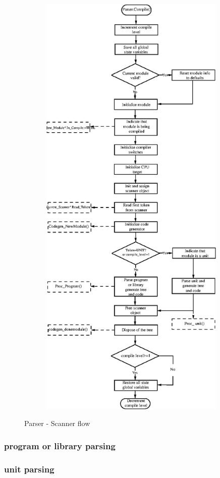 \documentclass [a4paper,12pt]{article}
\begin{document}
\begin{figure}
\begin{center}
\includegraphics[width=4.99in,height=8.36in]{arch8.eps}
\fi
\label{fig8}
\caption{Parser - Scanner flow}
\end{center}
\end{figure}

\subsubsection{program or library parsing }

\subsubsection{unit parsing }
\label{subsubsec:mylabel12}
\end{document}
